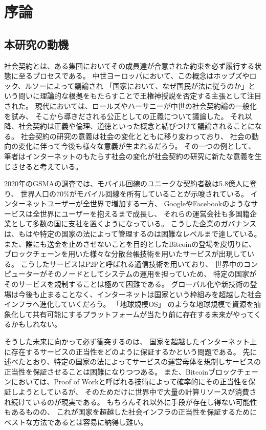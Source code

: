 \chapter{序論}
  \section{本研究の動機}
  \label{motivation}
  社会契約とは、ある集団においてその成員達が合意された約束を必ず履行する状態に至るプロセスである。
  中世ヨーロッパにおいて、この概念はホッブズやロック、ルソーによって議論され
  「国家において、なぜ国民が法に従うのか」という問いに理論的な根拠をもたらすことで王権神授説を否定する主張として注目された。
  現代においては、ロールズ\cite{rawls1971}やハーサニー\cite{harsanyi1955}が中世の社会契約論の一般化を試み、
  そこから導きだされる公正としての正義について議論した。
  それ以降、社会契約は正義や倫理、道徳といった概念と結びつけて議論されることになる。
  社会契約の研究の意義は社会の変化とともに移り変わっており、
  社会の動向の変化に伴って今後も様々な意義が生まれるだろう。
  その一つの例として、筆者はインターネットのもたらす社会の変化が社会契約の研究に新たな意義を生じさせると考えている。

  2020年のGSMA\cite{gsma2020}の調査では、モバイル回線のユニークな契約者数は5.8億人に登り、
  世界人口の70\%がモバイル回線を所有していることが示唆されている。
  インターネットユーザーが全世界で増加する一方、
  Google\cite{google}やFacebook\cite{facebook}のようなサービスは全世界にユーザーを抱えるまで成長し、
  それらの運営会社も多国籍企業として多数の国に支社を置くようになっている。
  こうした企業のガバナンスは、もはや特定の国家の法によって管理するのは困難なレベルまで達している。
  また、誰にも送金を止めさせないことを目的としたBitcoin\cite{nakamoto2008bitcoin}の登場を皮切りに、
  ブロックチェーンを用いた様々な分散台帳技術を用いたサービスが出現している。
  こうしたサービスはP2Pと呼ばれる通信技術を用いており、
  世界中のコンピューターがそのノードとしてシステムの運用を担っていため、
  特定の国家がそのサービスを規制することは極めて困難である。
  グローバル化や新技術の登場は今後も止まることなく、インターネットは国家という枠組みを超越した社会インフラへ進化していくだろう。
  「地球規模OS」\cite{saito&ikemoto2008} のような地球規模で資源を抽象化して共有可能にするプラットフォームが当たり前に存在する未来がやってくるかもしれない。

  そうした未来に向かって必ず衝突するのは、
  国家を超越したインターネット上に存在するサービスの正当性をどのように保証するかという問題である。
  先に述べたとおり、特定の国家の法によってサービスの運営母体を規制しサービスの正当性を保証させることは困難になりつつある。
  また、Bitcoinブロックチェーンにおいては、Proof of Workと呼ばれる技術によって確率的にその正当性を保証しようとしているが、
  そのためだけに世界中で大量の計算リソースが消費され続けているのが現実である。
  もちろんそれ以外に手段が存在し得ない可能性もあるものの、
  これが国家を超越した社会インフラの正当性を保証するためにベストな方法であるとは容易に納得し難い。


